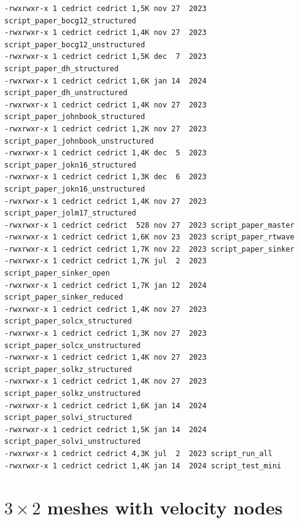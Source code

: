 \begin{verbatim}
-rwxrwxr-x 1 cedrict cedrict 1,5K nov 27  2023 script_paper_bocg12_structured
-rwxrwxr-x 1 cedrict cedrict 1,4K nov 27  2023 script_paper_bocg12_unstructured
-rwxrwxr-x 1 cedrict cedrict 1,5K dec  7  2023 script_paper_dh_structured
-rwxrwxr-x 1 cedrict cedrict 1,6K jan 14  2024 script_paper_dh_unstructured
-rwxrwxr-x 1 cedrict cedrict 1,4K nov 27  2023 script_paper_johnbook_structured
-rwxrwxr-x 1 cedrict cedrict 1,2K nov 27  2023 script_paper_johnbook_unstructured
-rwxrwxr-x 1 cedrict cedrict 1,4K dec  5  2023 script_paper_jokn16_structured
-rwxrwxr-x 1 cedrict cedrict 1,3K dec  6  2023 script_paper_jokn16_unstructured
-rwxrwxr-x 1 cedrict cedrict 1,4K nov 27  2023 script_paper_jolm17_structured
-rwxrwxr-x 1 cedrict cedrict  528 nov 27  2023 script_paper_master
-rwxrwxr-x 1 cedrict cedrict 1,6K nov 23  2023 script_paper_rtwave
-rwxrwxr-x 1 cedrict cedrict 1,7K nov 22  2023 script_paper_sinker
-rwxrwxr-x 1 cedrict cedrict 1,7K jul  2  2023 script_paper_sinker_open
-rwxrwxr-x 1 cedrict cedrict 1,7K jan 12  2024 script_paper_sinker_reduced
-rwxrwxr-x 1 cedrict cedrict 1,4K nov 27  2023 script_paper_solcx_structured
-rwxrwxr-x 1 cedrict cedrict 1,3K nov 27  2023 script_paper_solcx_unstructured
-rwxrwxr-x 1 cedrict cedrict 1,4K nov 27  2023 script_paper_solkz_structured
-rwxrwxr-x 1 cedrict cedrict 1,4K nov 27  2023 script_paper_solkz_unstructured
-rwxrwxr-x 1 cedrict cedrict 1,6K jan 14  2024 script_paper_solvi_structured
-rwxrwxr-x 1 cedrict cedrict 1,5K jan 14  2024 script_paper_solvi_unstructured
-rwxrwxr-x 1 cedrict cedrict 4,3K jul  2  2023 script_run_all
-rwxrwxr-x 1 cedrict cedrict 1,4K jan 14  2024 script_test_mini
\end{verbatim}




\newpage
\section*{$3\times 2$ meshes with velocity nodes}

\begin{multicols}{2}


\begin{tiny}

\end{tiny}
\end{multicols}

